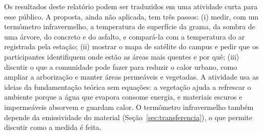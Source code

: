 \documentclass[
12pt,			%
openany,		%
oneside,		%
a4paper,		%
sumario=tradicional,
chapter=TITLE,
section=TITLE,
subsection=Title,
brazil,			%
]{abntex2}
\begin{document}
	Os resultados deste relatório podem ser traduzidos em uma atividade curta para esse público. A proposta, ainda não aplicada, tem três passos: (i) medir, com um termômetro infravermelho, a temperatura de superfície da grama, da sombra de uma árvore, do concreto e do asfalto, e compará-la com a temperatura do ar registrada pela estação; (ii) mostrar o mapa de satélite do campus e pedir que os participantes identifiquem onde estão as áreas mais quentes e por quê; (iii) discutir o que a comunidade pode fazer para reduzir o calor urbano, como ampliar a arborização e manter áreas permeáveis e vegetadas. A atividade usa as ideias da fundamentação teórica sem equações: a vegetação ajuda a refrescar o ambiente porque a água que evapora consome energia, e materiais escuros e impermeáveis absorvem e guardam calor. O termômetro infravermelho também depende da emissividade do material (Seção~\ref{sec:transferencia}), o que permite discutir como a medida é feita.
	
	\postextual
	\pagebreak
	
	
	
\end{document}
